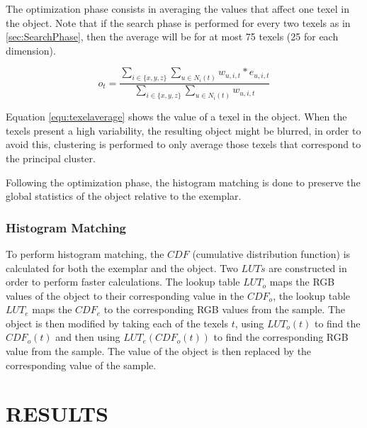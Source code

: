 The optimization phase consists in averaging the values that affect one texel in the object. Note that
if the search phase is performed for every two texels as in \ref{sec:SearchPhase}, 
then the average will be for at most 75 texels (25 for each dimension).

\begin{equation}
 o_t = \frac{ \sum_{i \in \{x, y, z\}} \sum_{u \in N_i(t)} w_{u, i, t} * e_{u, i, t} }{ \sum_{i \in \{x, y, z\}} \sum_{u \in N_i(t)} w_{u, i, t} }
 \label{equ:texelaverage}
\end{equation}

Equation \ref{equ:texelaverage} shows the value of a texel in the object. 
When the texels present a high variability, the resulting object might be
blurred, in order to avoid this, 
clustering is performed to only average those texels that correspond to the principal cluster.

Following the optimization phase, the histogram matching is done to preserve the 
global statistics of the object relative to the exemplar. 

\subsubsection{Histogram Matching}
\label{sec:histogramMatching}

To perform histogram matching, the $CDF$ (cumulative distribution function) is calculated for both the exemplar 
and the object. 
Two $LUTs$ are constructed in order to perform faster calculations. 
The lookup table $LUT_o$ maps the RGB values of the object
to their corresponding value in the $CDF_o$, 
the lookup table $LUT_e$ maps the $CDF_e$
to the corresponding RGB values from the sample. 
The object is then modified by taking each of the texels $t$, using $LUT_o(t)$ to find the $CDF_o(t)$
and then using $LUT_e(CDF_o(t))$ to find the corresponding RGB value from the sample. The value of the object 
is then replaced by the corresponding value of the sample.


\section{\uppercase{Results}}
\label{sec:Results}

